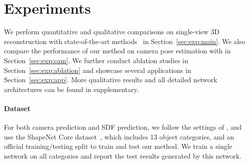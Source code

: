\section{Experiments}
\vspace{-10pt}


We perform quantitative and qualitative comparisons on single-view 3D reconstruction with state-of-the-art methods~\cite{groueix2018,wang2018pixel2mesh,wang20193dn,chen2018learning,Mescheder2019CVPR} in Section~\ref{sec:exp:main}. We also compare the performance of our method on camera pose estimation with \cite{insafutdinov18pointclouds} in Section~\ref{sec:exp:cam}. We further conduct ablation studies in Section~\ref{sec:exp:ablation} and showcase several applications in Section~\ref{sec:exp:app}. More qualitative results and all detailed network architectures can be found in supplementary.
\vspace{-5pt}

\paragraph{Dataset} For both camera prediction and SDF prediction, we follow the settings of \cite{groueix2018,wang2018pixel2mesh,wang20193dn,Mescheder2019CVPR}, and use the ShapeNet Core dataset~\cite{shapenet}, which includes 13 object categories, and an official training/testing split to train and test our method. We train a single network on all categories and report the test results generated by this network.

